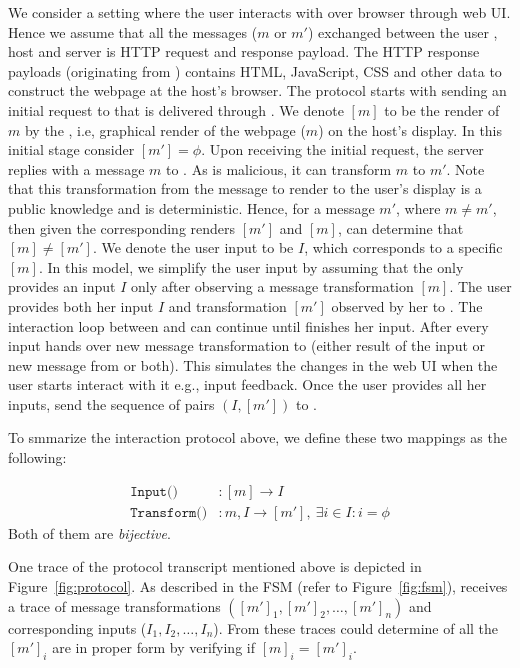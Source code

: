 We consider a setting where the user \user interacts with \server over browser through web UI. Hence we assume that all the messages ($m$ or $m'$) exchanged between the user \user, host \host and server \server is HTTP request and response payload. The HTTP response payloads (originating from \server) contains HTML, JavaScript, CSS and other data to construct the webpage at the host's browser. The protocol starts with \user sending an initial request to \server that is delivered through \host. We denote $[m]$ to be the render of $m$ by the \host, i.e, graphical render of the webpage ($m$) on the host's display. In this initial stage consider $[m'] = \phi$. Upon receiving the initial request, the server \server replies with a message $m$ to \host. As \host is malicious, it can transform $m$ to $m'$. Note that this transformation from the message to render to the user's display is a public knowledge and is deterministic. Hence, for a message $m'$, where $m\neq m'$, then given the corresponding renders $[m']$ and $[m]$, \server can determine that $[m]\neq [m']$. We denote the user input to be $I$, which corresponds to a specific $[m]$. 
In this model, we simplify the user input by assuming that the \user only provides an input $I$ only after observing a message transformation $[m]$. The user provides both her input $I$ and transformation $[m']$ observed by her to \host. The interaction loop between \host and \user can continue until \user finishes her input. After every input \host hands over new message transformation to \user (either result of the input or new message from \server or both). This simulates the changes in the web UI when the user starts interact with it e.g., input feedback. Once the user provides all her inputs, \host send the sequence of pairs $(I, [m'])$ to \server.

To smmarize the interaction protocol above, we define these two mappings as the following:

\begin{align*}
\texttt{Input()}&:[m]\rightarrow I \\
\texttt{Transform()}&:m,I\rightarrow [m'],\ \exists i\in I:i=\phi
\end{align*}
Both of them are \emph{bijective}.

One trace of the protocol transcript mentioned above is depicted in Figure~\ref{fig:protocol}. As described in the FSM (refer to Figure~\ref{fig:fsm}), \server receives a trace of message transformations $([m']_1,[m']_2,\ldots,[m']_n)$ and corresponding inputs ($I_1,I_2,\ldots,I_n$). From these traces \server could determine of all the $[m']_i$ are in proper form by verifying if $[m]_i=[m']_i$.


